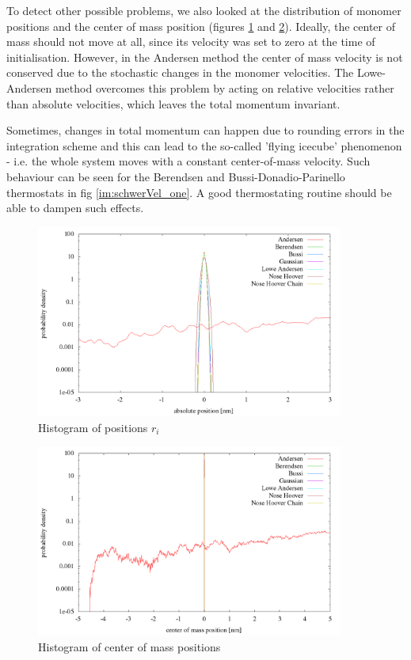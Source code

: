 To detect other possible problems, we also looked at the distribution of monomer positions and the center of mass position (figures \ref{im:absPos_rand} and \ref{im:schwerPos_rand}). Ideally, the center of mass should not move at all, since its velocity was set to zero at the time of initialisation. However, in the Andersen method the center of mass velocity is not conserved due to the stochastic changes in the monomer velocities. The Lowe-Andersen method overcomes this problem by acting on relative velocities rather than absolute velocities, which leaves the total momentum invariant. 

Sometimes, changes in total momentum can happen due to rounding errors in the integration scheme and this can lead to the so-called 'flying icecube' phenomenon - i.e. the whole system moves with a constant center-of-mass velocity. Such behaviour can be seen for the Berendsen and Bussi-Donadio-Parinello thermostats in fig \ref{im:schwerVel_one}. A good thermostating routine should be able to dampen such effects.
\begin{figure}[H]
    \centering
    \includegraphics[width=0.9\textwidth]{./graphics/Histogramm_absPosition_rand_T=20_p=64.png}
  	\caption{Histogram of positions $r_i$}
    \label{im:absPos_rand}
\end{figure}

\begin{figure}[H]
    \centering
    \includegraphics[width=0.9\textwidth]{./graphics/Histogramm_schwerPos_rand_T=20_p=64.png}
    \caption{Histogram of center of mass positions}
    \label{im:schwerPos_rand}
\end{figure}

